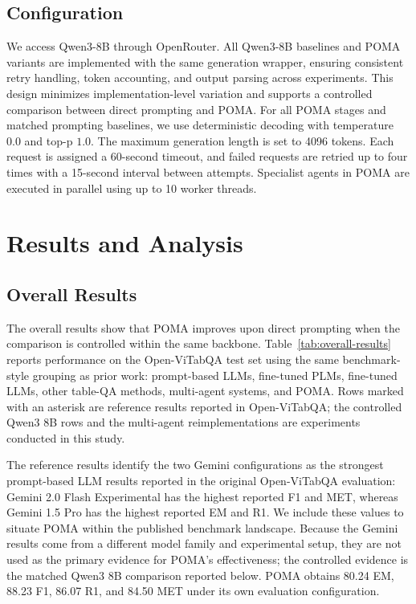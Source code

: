 \documentclass[]{interact}
\begin{document}
\subsection{Configuration}

We access Qwen3-8B through OpenRouter. All Qwen3-8B baselines and POMA variants are implemented with the same generation wrapper, ensuring consistent retry handling, token accounting, and output parsing across experiments. This design minimizes implementation-level variation and supports a controlled comparison between direct prompting and POMA. For all POMA stages and matched prompting baselines, we use deterministic decoding with temperature $0.0$ and top-p $1.0$. The maximum generation length is set to 4096 tokens. Each request is assigned a 60-second timeout, and failed requests are retried up to four times with a 15-second interval between attempts. Specialist agents in POMA are executed in parallel using up to 10 worker threads.


\section{Results and Analysis}\label{sec:results}

\subsection{Overall Results}

The overall results show that POMA improves upon direct prompting when the comparison is controlled within the same backbone. Table~\ref{tab:overall-results} reports performance on the Open-ViTabQA test set using the same benchmark-style grouping as prior work: prompt-based LLMs, fine-tuned PLMs, fine-tuned LLMs, other table-QA methods, multi-agent systems, and POMA. Rows marked with an asterisk are reference results reported in Open-ViTabQA; the controlled Qwen3 8B rows and the multi-agent reimplementations are experiments conducted in this study.

The reference results identify the two Gemini configurations as the strongest prompt-based LLM results reported in the original Open-ViTabQA evaluation: Gemini 2.0 Flash Experimental has the highest reported F1 and MET, whereas Gemini 1.5 Pro has the highest reported EM and R1. We include these values to situate POMA within the published benchmark landscape. Because the Gemini results come from a different model family and experimental setup, they are not used as the primary evidence for POMA's effectiveness; the controlled evidence is the matched Qwen3 8B comparison reported below. POMA obtains 80.24 EM, 88.23 F1, 86.07 R1, and 84.50 MET under its own evaluation configuration.
\end{document}

